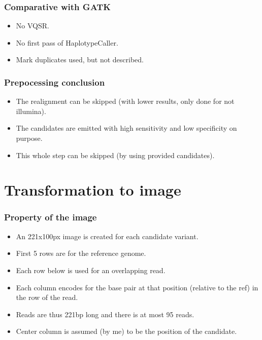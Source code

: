 \documentclass{beamer}
\begin{document}
\begin{frame}
    \frametitle{Comparative with GATK}

    \begin{itemize}
        \item No VQSR.
        \item No first pass of HaplotypeCaller.
        \item Mark duplicates used, but not described.
    \end{itemize}

\end{frame}

\begin{frame}
    \frametitle{Prepocessing conclusion}

    \begin{itemize}
        \item The realignment can be skipped (with lower results, only done for not illumina).
        \item The candidates are emitted with high sensitivity and low specificity on purpose.
        \item This whole step can be skipped (by using provided candidates).
    \end{itemize}

\end{frame}

\section{Transformation to image}

\begin{frame}
    \frametitle{Property of the image}

    \begin{itemize}
        \item An 221x100px image is created for each candidate variant.
        \item First 5 rows are for the reference genome.
        \item Each row below is used for an overlapping read.
        \item Each column encodes for the base pair at that position (relative to the ref) in the
            row of the read.
        \item Reads are thus 221bp long and there is at most 95 reads.
        \item Center column is assumed (by me) to be the position of the candidate.
    \end{itemize}

\end{frame}
\end{document}
